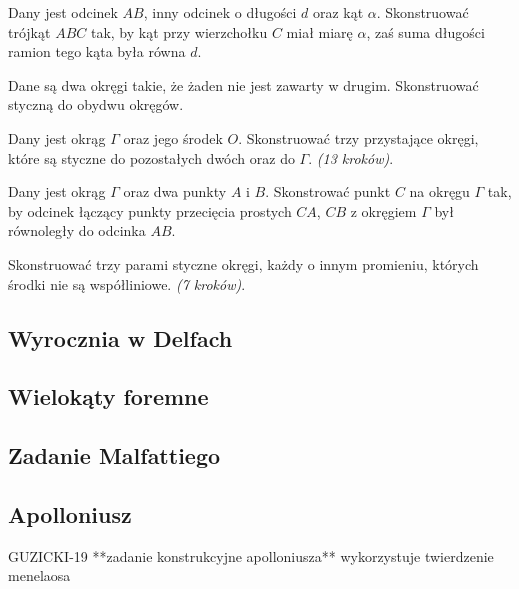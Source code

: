 \begin{problem}
    Dany jest odcinek $AB$, inny odcinek o długości $d$ oraz kąt $\alpha$.
    Skonstruować trójkąt $ABC$ tak, by kąt przy wierzchołku $C$ miał miarę $\alpha$, zaś suma długości ramion tego kąta była równa $d$.
\end{problem}

\begin{problem}
    Dane są dwa okręgi takie, że żaden nie jest zawarty w drugim.
    Skonstruować styczną do obydwu okręgów.
\end{problem}

\begin{problem}
    Dany jest okrąg $\Gamma$ oraz jego środek $O$.
    Skonstruować trzy przystające okręgi, które są styczne do pozostałych dwóch oraz do $\Gamma$. \hfill \emph{(13 kroków)}. %
\end{problem}

\begin{problem}
    Dany jest okrąg $\Gamma$ oraz dwa punkty $A$ i $B$.
    Skonstrować punkt $C$ na okręgu $\Gamma$ tak, by odcinek łączący punkty przecięcia prostych $CA$, $CB$ z okręgiem $\Gamma$ był równoległy do odcinka $AB$.
\end{problem}

\begin{problem}
    Skonstruować trzy parami styczne okręgi, każdy o innym promieniu, których środki nie są współliniowe. \hfill \emph{(7 kroków)}. %
\end{problem}

\subsection{Wyrocznia w Delfach}


\subsection{Wielokąty foremne}


\subsection{Zadanie Malfattiego}


\subsection{Apolloniusz}
GUZICKI-19 **zadanie konstrukcyjne apolloniusza** wykorzystuje twierdzenie menelaosa

